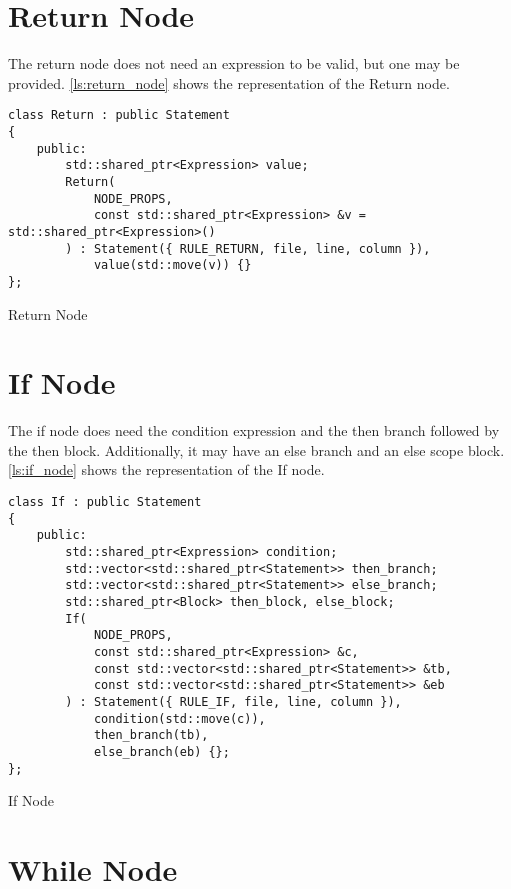 \section{Return Node}

The return node does not need an expression to be valid, but one may be provided.
\autoref{ls:return_node} shows the representation of the Return node.

\begin{listing}[H]
\begin{verbatim}
class Return : public Statement
{
    public:
        std::shared_ptr<Expression> value;
        Return(
            NODE_PROPS,
            const std::shared_ptr<Expression> &v = std::shared_ptr<Expression>()
        ) : Statement({ RULE_RETURN, file, line, column }),
            value(std::move(v)) {}
};
\end{verbatim}
\caption{Return Node}
\label{ls:return_node}
\end{listing}

\section{If Node}

The if node does need the condition expression and the then branch followed by the then block.
Additionally, it may have an else branch and an else scope block.
\autoref{ls:if_node} shows the representation of the If node.

\begin{listing}[H]
\begin{verbatim}
class If : public Statement
{
    public:
        std::shared_ptr<Expression> condition;
        std::vector<std::shared_ptr<Statement>> then_branch;
        std::vector<std::shared_ptr<Statement>> else_branch;
        std::shared_ptr<Block> then_block, else_block;
        If(
            NODE_PROPS,
            const std::shared_ptr<Expression> &c,
            const std::vector<std::shared_ptr<Statement>> &tb,
            const std::vector<std::shared_ptr<Statement>> &eb
        ) : Statement({ RULE_IF, file, line, column }),
            condition(std::move(c)),
            then_branch(tb),
            else_branch(eb) {};
};
\end{verbatim}
\caption{If Node}
\label{ls:if_node}
\end{listing}

\section{While Node}

